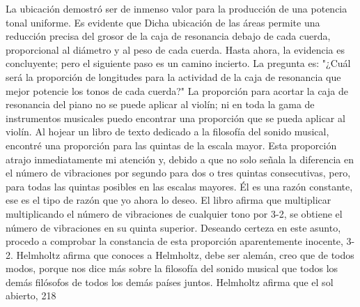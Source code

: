 La ubicación demostró ser de inmenso valor para la producción de una potencia tonal uniforme. Es evidente que
Dicha ubicación de las áreas permite una reducción precisa del grosor de la caja de resonancia debajo de cada cuerda, proporcional al diámetro y al peso de cada cuerda.
Hasta ahora, la evidencia es concluyente; pero el siguiente paso es un camino incierto. La pregunta es: "¿Cuál será la proporción de longitudes para la actividad de la caja de resonancia que mejor potencie los tonos de cada cuerda?"
La proporción para acortar la caja de resonancia del piano no se puede aplicar al violín; ni en toda la gama de instrumentos musicales puedo encontrar una proporción que se pueda aplicar al violín.
Al hojear un libro de texto dedicado a la filosofía del sonido musical, encontré una proporción para las quintas de la escala mayor. Esta proporción atrajo inmediatamente mi atención y, debido a que no solo señala la diferencia en el número de vibraciones por segundo para dos o tres quintas consecutivas,
pero, para todas las quintas posibles en las escalas mayores.	Él
es una razón constante, ese es el tipo de razón que yo	
ahora lo deseo.	El libro afirma que multiplicar
multiplicando el número de vibraciones de cualquier tono por 3-2, se obtiene el número de vibraciones en su quinta superior. Deseando certeza en este asunto, procedo a comprobar la constancia de esta proporción aparentemente inocente, 3-2. Helmholtz afirma que conoces a Helmholtz, debe ser alemán, creo que de todos modos, porque nos dice más sobre la filosofía del sonido musical que todos los demás filósofos de todos los demás países juntos. Helmholtz afirma que el sol abierto,
218

